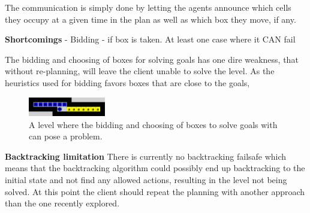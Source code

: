 \documentclass[Main]{subfiles}
\begin{document}
The communication is simply done by letting the agents announce which cells they occupy at a given time in the plan as well as which box they move, if any. 



\textbf{Shortcomings}
- Bidding - if box is taken. At least one case where it CAN fail

The bidding and choosing of boxes for solving goals has one dire weakness, that without re-planning, will leave the client unable to solve the level. As the heuristics used for bidding favors boxes that are close to the goals,


\begin{figure}[h!]
    \centering
    \includegraphics[width=0.3\textwidth]{shortcomings.png}
    \caption{A level where the bidding and choosing of boxes to solve goals with can pose a problem.}
    \label{fig:shortcomings}
\end{figure}


\textbf{Backtracking limitation}
There is currently no backtracking failsafe which means that the backtracking algorithm could possibly end up backtracking to the initial state and not find any allowed actions, resulting in the level not being solved. 
At this point the client should repeat the planning with another approach than the one recently explored. 
\end{document}
